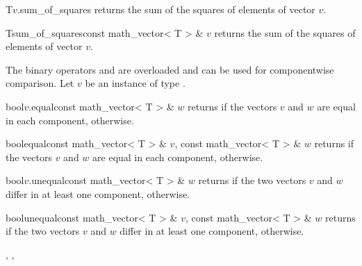 

\begin{fcode}{T}{$v$.sum_of_squares}{}
  returns the sum of the squares of elements of vector $v$.
\end{fcode}

\begin{fcode}{T}{sum_of_squares}{const math_vector< T > & $v$}
  returns the sum of the squares of elements of vector $v$.
\end{fcode}



\COMP

The binary operators \code{==} and \code{!=} are overloaded and can be used for componentwise
comparison.  Let $v$ be an instance of type .

\begin{cfcode}{bool}{$v$.equal}{const math_vector< T > & $w$}
  returns \TRUE if the vectors $v$ and $w$ are equal in each component, \FALSE otherwise.
\end{cfcode}

\begin{fcode}{bool}{equal}{const math_vector< T > & $v$, const math_vector< T > & $w$}
  returns \TRUE if the vectors $v$ and $w$ are equal in each component, \FALSE otherwise.
\end{fcode}

\begin{cfcode}{bool}{$v$.unequal}{const math_vector< T > & $w$}
  returns \TRUE if the two vectors $v$ and $w$ differ in at least one component, \FALSE
  otherwise.
\end{cfcode}

\begin{fcode}{bool}{unequal}{const math_vector< T > & $v$, const math_vector< T > & $w$}
  returns \TRUE if the two vectors $v$ and $w$ differ in at least one component, \FALSE
  otherwise.
\end{fcode}



\SEEALSO

, ,



